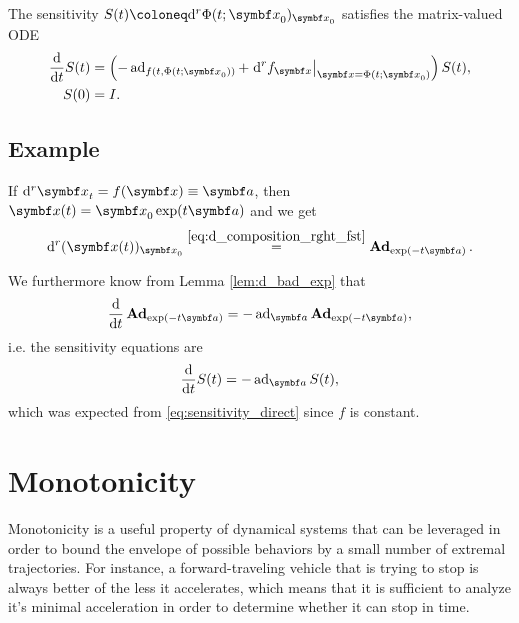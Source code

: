 \begin{important}
  The sensitivity $S(t) \coloneq \mathrm{d}^r \Phi(t; \x_{0})_{\x_{0}}$ satisfies the matrix-valued ODE
  \begin{equation}
    \label{eq:sensitivity_direct}
    \begin{aligned}
      \frac{\mathrm{d}}{\mathrm{d}t} S(t) & = \left(-\ad_{f(t, \Phi(t; \x_{0}))} + \left. \mathrm{d}^{r} f_{\x} \right|_{\x = \Phi(t; \x_{0})} \right) S(t), \\
      S(0)                                & = I.
    \end{aligned}
  \end{equation}
\end{important}

\subsection{Example}

\begin{example}
  If $\mathrm{d}^{r} \x_{t} = f(\x) \equiv \a$, then $\x(t) = \x_{0} \exp(t \a)$ and we get
  \begin{equation}
    \mathrm{d}^{r} (\x(t))_{\x_{0}} \overset{\eqref{eq:d_composition_rght_fst}} = \bAd_{\exp(-t \a)}.
  \end{equation}

  We furthermore know from Lemma \ref{lem:d_bad_exp} that
  \begin{equation}
    \label{eq:1}
    \frac{\mathrm{d}}{\mathrm{d}t} \bAd_{\exp(-t \a)} = -\ad_{\a} \bAd_{\exp(-t \a)},
  \end{equation}
  i.e. the sensitivity equations are
  \begin{equation}
    \label{eq:13}
    \frac{\mathrm{d}}{\mathrm{d}t} S(t) = -\ad_{\a} S(t),
  \end{equation}
  which was expected from \eqref{eq:sensitivity_direct} since $f$ is constant.
\end{example}

\section{Monotonicity}


Monotonicity is a useful property of dynamical systems that can be leveraged in order to bound the envelope of possible behaviors by a small number of extremal trajectories. For instance, a forward-traveling vehicle that is trying to stop is always better of the less it accelerates, which means that it is sufficient to analyze it's minimal acceleration in order to determine whether it can stop in time.

